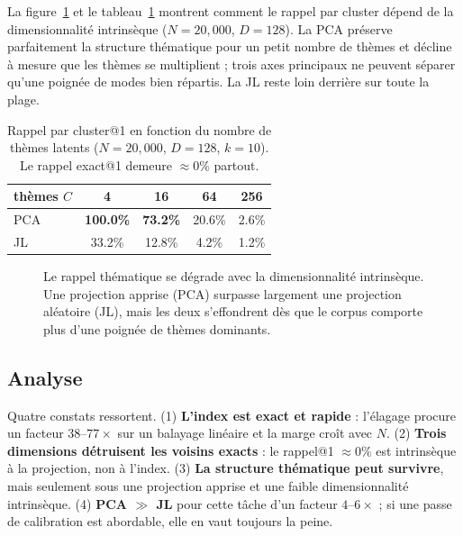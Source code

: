 \documentclass[11pt]{article}
\begin{document}
La figure~\ref{fig:sweep} et le tableau~\ref{tab:sweep} montrent comment le rappel par
cluster dépend de la dimensionnalité intrinsèque ($N{=}20{,}000$, $D{=}128$). La PCA
préserve parfaitement la structure thématique pour un petit nombre de thèmes et
décline à mesure que les thèmes se multiplient ; trois axes principaux ne peuvent
séparer qu'une poignée de modes bien répartis. La JL reste loin derrière sur toute la
plage.

\begin{table}[t]
\centering
\caption{Rappel par cluster@1 en fonction du nombre de thèmes latents ($N{=}20{,}000$,
$D{=}128$, $k{=}10$). Le rappel exact@1 demeure $\approx 0\%$ partout.}
\label{tab:sweep}
\begin{tabular}{lcccc}
\toprule
thèmes $C$ & 4 & 16 & 64 & 256 \\
\midrule
PCA & \textbf{100.0\%} & \textbf{73.2\%} & 20.6\% & 2.6\% \\
JL  & 33.2\%           & 12.8\%          & 4.2\%  & 1.2\% \\
\bottomrule
\end{tabular}
\end{table}

\begin{figure}[t]
\centering
{}
\caption{Le rappel thématique se dégrade avec la dimensionnalité intrinsèque. Une
projection apprise (PCA) surpasse largement une projection aléatoire (JL), mais les
deux s'effondrent dès que le corpus comporte plus d'une poignée de thèmes dominants.}
\label{fig:sweep}
\end{figure}

\subsection{Analyse}
Quatre constats ressortent. (1) \textbf{L'index est exact et rapide} : l'élagage
procure un facteur $38$--$77\times$ sur un balayage linéaire et la marge croît avec
$N$. (2) \textbf{Trois dimensions détruisent les voisins exacts} : le rappel@1
$\approx 0\%$ est intrinsèque à la projection, non à l'index. (3) \textbf{La structure
thématique peut survivre}, mais seulement sous une projection apprise et une faible
dimensionnalité intrinsèque. (4) \textbf{PCA $\gg$ JL} pour cette tâche d'un facteur
$4$--$6\times$ ; si une passe de calibration est abordable, elle en vaut toujours la
peine.
\end{document}

